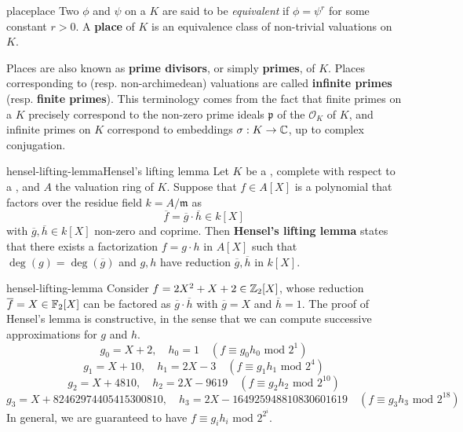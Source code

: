 \begin{topic}{place}{place}
    Two  $\phi$ and $\psi$ on a  $K$ are said to be \textit{equivalent} if $\phi = \psi^r$ for some constant $r > 0$. A \textbf{place} of $K$ is an equivalence class of non-trivial valuations on $K$.
    
    Places are also known as \textbf{prime divisors}, or simply \textbf{primes}, of $K$. Places corresponding to  (resp. non-archimedean) valuations are called \textbf{infinite primes} (resp. \textbf{finite primes}). This terminology comes from the fact that finite primes on a  $K$ precisely correspond to the non-zero prime ideals $\mathfrak{p}$ of the  $\mathcal{O}_K$ of $K$, and infinite primes on $K$ correspond to embeddings $\sigma : K \to \mathbb{C}$, up to complex conjugation.
\end{topic}

    

\begin{topic}{hensel-lifting-lemma}{Hensel's lifting lemma}
    Let $K$ be a , complete with respect to a  , and $A$ the valuation ring of $K$.
    Suppose that $f \in A[X]$ is a polynomial that factors over the residue field $k = A / \mathfrak{m}$ as
    \[ \overline{f} = \overline{g} \cdot \overline{h} \in k[X] \]
    with $\overline{g}, \overline{h} \in k[X]$ non-zero and coprime. Then \textbf{Hensel's lifting lemma} states that there exists a factorization $f = g \cdot h$ in $A[X]$ such that $\deg(g) = \deg(\overline{g})$ and $g, h$ have reduction $\overline{g}, \overline{h}$ in $k[X]$.
\end{topic}

\begin{example}{hensel-lifting-lemma}
    Consider $f = 2X^2 + X + 2 \in \mathbb{Z}_2[X]$, whose reduction $\overline{f} = X \in \mathbb{F}_2[X]$ can be factored as $\overline{g} \cdot \overline{h}$ with $\overline{g} = X$ and $\overline{h} = 1$. The proof of Hensel's lemma is constructive, in the sense that we can compute successive approximations for $g$ and $h$.
    \[ g_0 = X + 2, \quad h_0 = 1 \quad (f \equiv g_0 h_0 \text{ mod } 2^1) \]
    \[ g_1 = X + 10, \quad h_1 = 2X - 3 \quad (f \equiv g_1 h_1 \text{ mod } 2^4) \]
    \[ g_2 = X + 4810, \quad h_2 = 2X - 9619 \quad (f \equiv g_2 h_2 \text{ mod } 2^{10}) \]
    \[ g_3 = X + 82462974405415300810, \quad h_3 = 2X - 164925948810830601619 \quad (f \equiv g_3 h_3 \text{ mod } 2^{18}) \]
    In general, we are guaranteed to have $f \equiv g_i h_i \text{ mod } 2^{2^i}$.
\end{example}

